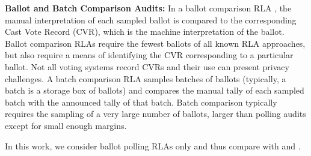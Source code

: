 {\bf Ballot and Batch Comparison Audits:} In a ballot comparison RLA \cite{RLA}, the manual interpretation of each sampled ballot is compared to the corresponding Cast Vote Record (CVR), which is the machine interpretation of the ballot. Ballot comparison RLAs require the fewest ballots of all known RLA approaches, but also require a means of identifying the CVR corresponding to a particular ballot. Not all voting systems record CVRs and their use can present privacy challenges. %
A batch comparison RLA \cite{RI-report} samples batches of ballots (typically, a batch is a storage box of ballots) and compares the manual tally of each sampled batch with the announced tally of that batch. %
Batch comparison typically requires the sampling of a very large number of ballots, larger than polling audits except for small enough margins. 

In this work, we consider ballot polling RLAs only and thus compare \Providence with \BRAVO and \Minerva.

